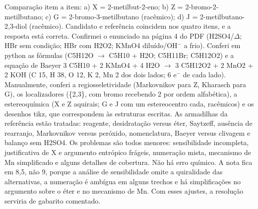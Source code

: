 \documentclass{article}%
\begin{document}
Comparação item a item: a) X = 2{-}metilbut{-}2{-}eno; b) Z = 2{-}bromo{-}2{-}metilbutano; c) G = 2{-}bromo{-}3{-}metilbutano (racêmico); d) J = 2{-}metilbutano{-}2,3{-}diol (racêmico). Candidato e referência coincidem nos quatro itens, e a resposta está correta. Confirmei o enunciado na página 4 do PDF (H2SO4/$\Delta$; HBr sem condição; HBr com H2O2; KMnO4 diluído/OH$^{-}$ a frio). Conferi em python as fórmulas (C5H12O $\to$ C5H10 + H2O; C5H11Br; C5H12O2) e a equação de Baeyer 3 C5H10 + 2 KMnO4 + 4 H2O $\to$ 3 C5H12O2 + 2 MnO2 + 2 KOH (C 15, H 38, O 12, K 2, Mn 2 dos dois lados; 6 e$^{-}$ de cada lado). Manualmente, conferi a regiosseletividade (Markovnikov para Z, Kharasch para G), os localizadores (\{2,3\}, com bromo recebendo 2 por ordem alfabética), a estereoquímica (X e Z aquirais; G e J com um estereocentro cada, racêmicos) e os desenhos tikz, que correspondem às estruturas escritas. As armadilhas da referência estão tratadas: reagente, desidratação versus éter, Saytzeff, ausência de rearranjo, Markovnikov versus peróxido, nomenclatura, Baeyer versus clivagem e balanço sem H2SO4. Os problemas são todos menores: sensibilidade incompleta, justificativa de X e argumento entrópico frágeis, numeração mista, mecanismo de Mn simplificado e alguns detalhes de cobertura. Não há erro químico. A nota fica em 8,5, não 9, porque a análise de sensibilidade omite a quiralidade das alternativas, a numeração é ambígua em alguns trechos e há simplificações no argumento sobre o éter e no mecanismo de Mn. Com esses ajustes, a resolução serviria de gabarito comentado.%
\end{document}
